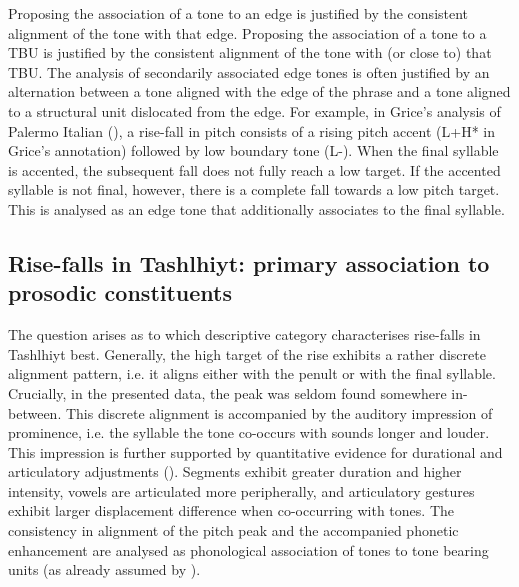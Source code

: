 Proposing the association of a tone to an edge is justified by the consistent alignment of the tone with that edge. Proposing the association of a tone to a TBU is justified by the consistent alignment of the tone with (or close to) that TBU. The analysis of secondarily associated edge tones is often justified by an alternation between a tone aligned with the edge of the phrase and a tone aligned to a structural unit dislocated from the edge. For example, in Grice’s analysis of Palermo Italian (\citeyear{Grice1995}), a rise-fall in pitch consists of a rising pitch accent (L+H* in Grice’s annotation) followed by low boundary tone (L-). When the final syllable is accented, the subsequent fall does not fully reach a low target. If the accented syllable is not final, however, there is a complete fall towards a low pitch target. This is analysed as an edge tone that additionally associates to the final syllable. 

\subsection{Rise-falls in Tashlhiyt: primary association to prosodic constituents}
The question arises as to which descriptive category characterises rise-falls in Tashlhiyt best. Generally, the high target of the rise exhibits a rather discrete alignment pattern, i.e. it aligns either with the penult or with the final syllable. Crucially, in the presented data, the peak was seldom found somewhere in-between. This discrete alignment is accompanied by the auditory impression of prominence, i.e. the syllable the tone co-occurs with sounds longer and louder. This impression is further supported by quantitative evidence for durational and articulatory adjustments (\citealt{Diercks2011,GordonNafi2012,Grice.etal2015tash}). Segments exhibit greater duration and higher intensity, vowels are articulated more peripherally, and articulatory gestures exhibit larger displacement difference when co-occurring with tones. The consistency in alignment of the pitch peak and the accompanied phonetic enhancement are analysed as phonological association of tones to tone bearing units (as already assumed by \citealt{DE1985}).

